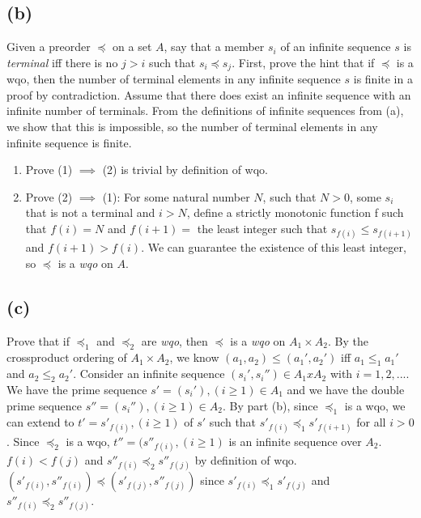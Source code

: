 \documentclass[12pt]{article}
\begin{document}
\subsection*{(b)}
Given a preorder $\preceq$ on a set $A$, 
say that a member $s_{i}$ of an infinite sequence $s$ is {\it terminal\/} iff
there is no $j>i$ such that $s_{i}\preceq s_{j}$. 
\newline
First, prove the hint that if $\preceq$ is a wqo, then
the number of terminal elements in any infinite  sequence $s$ is finite
in a proof by contradiction. 
Assume that there does exist an infinite sequence with an infinite number of 
terminals. From the definitions of infinite sequences from (a), 
we show that this is impossible, so the number of terminal elements in any 
infinite sequence is finite.
\begin{enumerate}
\item Prove (1) $\implies$ (2) is trivial by definition of wqo.
\item Prove (2) $\implies$ (1): 
\newline
For some natural number $N$, such that $N> 0$, some $s_i$ that is not
a terminal and $i>N$, define a strictly monotonic function f such that
$f(i)=N$ and $f(i+1)=$ the least integer such that $s_{f(i)} \le s_{f(i+1)}$
and $f(i+1) > f(i)$. We can guarantee the existence of this least integer,
so $\preceq$ is a {\it wqo\/} on $A$.
\end{enumerate}

\subsection*{(c)}
Prove that
if  $\preceq_{1}$ and $\preceq_{2}$ are {\it wqo\/}, 
then  $\preceq$ is a {\it wqo\/} on $A_{1}\times A_{2}$.
By the crossproduct ordering of $A_{1}\times A_{2}$,
we know $(a_1,a_2) \le (a_1', a_2')$
iff $a_1 \le_1 a_1'$ and $a_2 \le_2 a_2'$.
Consider an infinite sequence $(s_i ' , s_i '') \in A_1 x A_2$
with $i = 1,2,...$.
We have the prime sequence $s'=(s_i'),(i \ge 1) \in A_1$
and we have the double prime sequence
$s''=(s_i''),(i \ge 1) \in A_2$.
By part (b), since $\preceq_{1}$ is a wqo,
we can extend to $t'=s'_{f(i)},(i \ge 1)$ of $s'$
such that $s'_{f(i)} \preceq_{1} s'_{f(i+1)}$
for all $i>0$. Since $\preceq_{2}$ is a wqo,
$t''=(s''_{f(i)},(i \ge 1)$ is an infinite sequence over $A_2$. $f(i)<f(j)$ and 
$s''_{f(i)} \preceq_{2} s''_{f(j)}$
by definition of wqo. $(s'_{f(i)}, s''_{f(i)}) \preceq
(s'_{f(j)}, s''_{f(j)})$
since $s'_{f(i)} \preceq_{1} s'_{f(j)}$
and $s''_{f(i)} \preceq_{2} s''_{f(j)}$.
\end{document}
